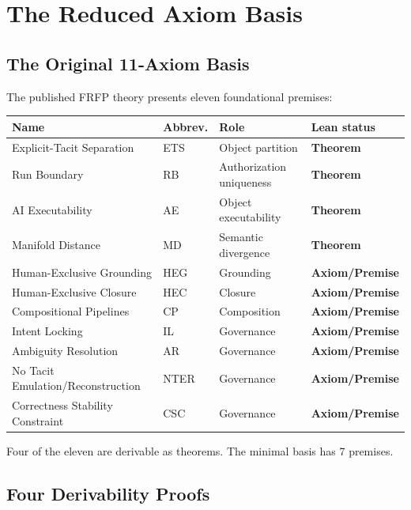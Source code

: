 \section{The Reduced Axiom Basis}
\label{ch:basis}

\subsection{The Original 11-Axiom Basis}

The published FRFP theory presents eleven foundational premises:

\begin{center}
\begin{tabular}{llll}
\toprule
Name & Abbrev. & Role & Lean status \\
\midrule
Explicit-Tacit Separation & ETS & Object partition & \textbf{Theorem} \\
Run Boundary & RB & Authorization uniqueness & \textbf{Theorem} \\
AI Executability & AE & Object executability & \textbf{Theorem} \\
Manifold Distance & MD & Semantic divergence & \textbf{Theorem} \\
Human-Exclusive Grounding & HEG & Grounding & \textbf{Axiom/Premise} \\
Human-Exclusive Closure & HEC & Closure & \textbf{Axiom/Premise} \\
Compositional Pipelines & CP & Composition & \textbf{Axiom/Premise} \\
Intent Locking & IL & Governance & \textbf{Axiom/Premise} \\
Ambiguity Resolution & AR & Governance & \textbf{Axiom/Premise} \\
No Tacit Emulation/Reconstruction & NTER & Governance & \textbf{Axiom/Premise} \\
Correctness Stability Constraint & CSC & Governance & \textbf{Axiom/Premise} \\
\bottomrule
\end{tabular}
\end{center}

Four of the eleven are derivable as theorems. The minimal basis has 7 premises.

\subsection{Four Derivability Proofs}

